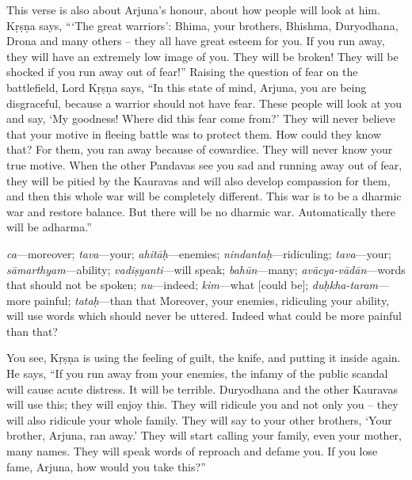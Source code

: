 This verse is also about Arjuna’s honour, about how people will look at him. Kṛṣṇa says, “‘The great warriors’: Bhima, your brothers, Bhishma, Duryodhana, Drona and many others – they all have great esteem for you. If you run away, they will have an extremely low image of you. They will be broken! They will be shocked if you run away out of fear!” Raising the question of fear on the battlefield, Lord Kṛṣṇa says, “In this state of mind, Arjuna, you are being disgraceful, because a warrior should not have fear. These people will look at you and say, ‘My goodness! Where did this fear come from?’ They will never believe that your motive in fleeing battle was to protect them. How could they know that? For them, you ran away because of cowardice. They will never know your true motive. When the other Pandavas see you sad and running away out of fear, they will be pitied by the Kauravas and will also develop compassion for them, and then this whole war will be completely different. This war is to be a dharmic war and restore balance. But there will be no dharmic war. Automatically there will be adharma.”

{%
  \textit{ca}---moreover; 
  \textit{tava}---your; 
  \textit{ahitāḥ}---enemies; 
  \textit{nindantaḥ}---ridiculing; 
  \textit{tava}---your; 
  \textit{sāmarthyam}---ability; 
  \textit{vadiṣyanti}---will speak; 
  \textit{bahūn}---many; 
  \textit{avācya-vādān}---words that should not be spoken; 
  \textit{nu}---indeed; 
  \textit{kim}---what [could be]; 
  \textit{duḥkha-taram}---more painful; 
  \textit{tataḥ}---than that
}
{%
  Moreover, your enemies, ridiculing your ability, will use words which should never be uttered. Indeed what could be more painful than that?
}

You see, Kṛṣṇa is using the feeling of guilt, the knife, and putting it inside again. He says, “If you run away from your enemies, the infamy of the public scandal will cause acute distress. It will be terrible. Duryodhana and the other Kauravas will use this; they will enjoy this. They will ridicule you and not only you – they will also ridicule your whole family. They will say to your other brothers, ‘Your brother, Arjuna, ran away.’ They will start calling your family, even your mother, many names. They will speak words of reproach and defame you. If you lose fame, Arjuna, how would you take this?”

